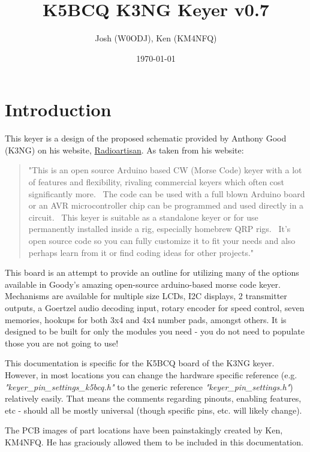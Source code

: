 \documentclass[11pt]{article}
\author{Josh (W0ODJ), Ken (KM4NFQ)}
\date{\today}
\title{K5BCQ K3NG Keyer v0.7}
\begin{document}
\maketitle
\tableofcontents


\section{Introduction}
\label{sec:org7d062b8}
This keyer is a design of the proposed schematic provided by Anthony Good (K3NG) on his website, \href{https://blog.radioartisan.com/arduino-cw-keyer}{Radioartisan}.  As taken from his website:
\begin{quote}
"This is an open source Arduino based CW (Morse Code) keyer with a lot of features and flexibility, rivaling commercial keyers which often cost significantly more.  The code can be used with a full blown Arduino board or an AVR microcontroller chip can be programmed and used directly in a circuit.  This keyer is suitable as a standalone keyer or for use permanently installed inside a rig, especially homebrew QRP rigs.  It’s open source code so you can fully customize it to fit your needs and also perhaps learn from it or find coding ideas for other projects."
\end{quote}


This board is an attempt to provide an outline for utilizing many of the options available in Goody's amazing open-source arduino-based morse code keyer.  Mechanisms are available for multiple size LCDs, I2C displays, 2 transmitter outputs, a Goertzel audio decoding input, rotary encoder for speed control, seven memories, hookups for both 3x4 and 4x4 number pads, amongst others.  It is designed to be built for only the modules you need - you do not need to populate those you are not going to use!

This documentation is specific for the K5BCQ board of the K3NG keyer.  However, in most locations you can change the hardware specific reference (e.g. \emph{"keyer\_pin\_settings\_k5bcq.h"} to the generic reference \emph{"keyer\_pin\_settings.h"}) relatively easily.  That means the comments regarding pinouts, enabling features, etc - should all be mostly universal (though specific pins, etc. will likely change).

The PCB images of part locations have been painstakingly created by Ken, KM4NFQ.  He has graciously allowed them to be included in this documentation.
\end{document}
